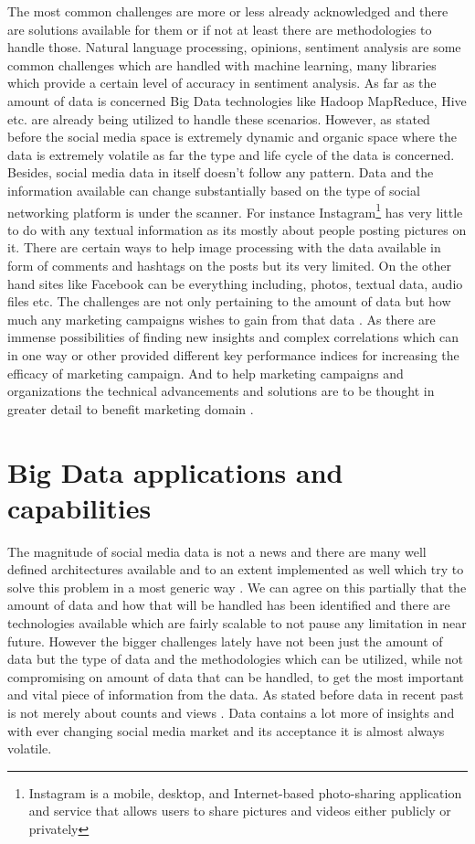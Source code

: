 \documentclass[sigconf]{acmart}
\begin{document}
The most common challenges are more or less already acknowledged and there are solutions available for them or if not at least there are methodologies to handle those. Natural language processing, opinions, sentiment analysis are some common challenges which are handled with machine learning, many libraries which provide a certain level of accuracy in sentiment analysis. As far as the amount of data is concerned Big Data technologies like Hadoop MapReduce, Hive etc. are already being utilized to handle these scenarios. However, as stated before the social media space is extremely dynamic and organic space where the data is extremely volatile as far the type and life cycle of the data is concerned.  Besides, social media data in itself doesn't follow any pattern. Data and the information available can change substantially based on the type of social networking platform is under the scanner. For instance Instagram\footnote{Instagram is a mobile, desktop, and Internet-based photo-sharing application and service that allows users to share pictures and videos either publicly or privately} has very little to do with any textual information as its mostly about people posting pictures on it. There are certain ways to help image processing with the data available in form of comments and hashtags on the posts but its very limited. On the other hand sites like Facebook can be everything including, photos, textual data, audio files etc. The challenges are not only pertaining to the amount of data but how much any marketing campaigns wishes to gain from that data \cite{HOFACKER201673}. As there are immense possibilities of finding new insights and complex correlations which can in one way or other provided different key performance indices for increasing the efficacy of marketing campaign. And to help marketing campaigns and organizations the technical advancements and solutions are to be thought in greater detail to benefit marketing domain \cite{AMADO2017}.

\section{Big Data applications and capabilities}
The magnitude of social media data is not a news and there are many well defined architectures available and to an extent implemented as well which try to solve this problem in a most generic way \cite{Olshannikova2017}. We can agree on this partially that the amount of data and how that will be handled has been identified and there are technologies available which are fairly scalable to not pause any limitation in near future. However the bigger challenges lately have not been just the amount of data but the type of data and the methodologies which can be utilized, while not compromising on amount of data that can be handled, to get the most important and vital piece of information from the data. As stated before data in recent past is not merely about counts and views \cite{mylynnfelt}. Data contains a lot more of insights and with ever changing social media market and its acceptance it is almost always volatile.
\end{document}
